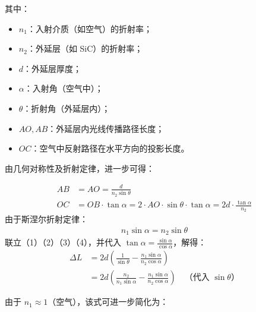 \documentclass{cumcmthesis}
\begin{document}
其中：

\begin{itemize}
    \item $n_1$：入射介质（如空气）的折射率；
    \item $n_2$：外延层（如 SiC）的折射率；
    \item $d$：外延层厚度；
    \item $\alpha$：入射角（空气中）；
    \item $\theta$：折射角（外延层内）；
    \item $AO, AB$：外延层内光线传播路径长度；
    \item $OC$：空气中反射路径在水平方向的投影长度。
\end{itemize}
由几何对称性及折射定律，进一步可得：

\begin{align}
AB &= AO = \frac{d}{n_2 \sin \theta}  \\
OC &= OB \cdot \tan \alpha = 2 \cdot AO \cdot \sin \theta \cdot \tan \alpha = 2d \cdot \frac{\tan \alpha}{n_2} 
\end{align}
由于斯涅尔折射定律：
\begin{gather}
n_1 \sin \alpha = n_2 \sin \theta 
\end{gather}
联立（1）（2）（3）（4），并代入 $\tan \alpha = \frac{\sin \alpha}{\cos \alpha}$，解得：
\begin{align*}
\Delta L &= 2d \left( \frac{1}{\sin \theta} - \frac{n_1 \sin \alpha}{n_2 \cos \alpha} \right) \\
&= 2d \left( \frac{n_2}{n_1 \sin \alpha} - \frac{n_1 \sin \alpha}{n_2 \cos \alpha} \right) \quad \text{（代入 $\sin \theta$）}
\end{align*}

由于 $n_1 \approx 1$（空气），该式可进一步简化为：
\end{document}
